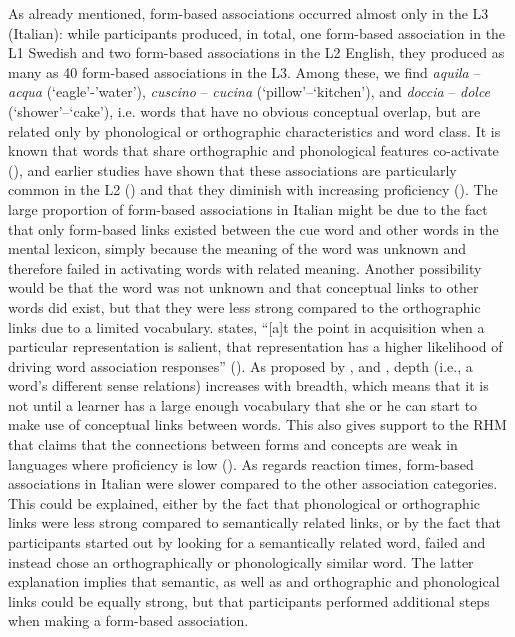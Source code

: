 \documentclass[output=paper,colorlinks,citecolor=brown,nonflat]{langsci/langscibook}
\begin{document}
As already mentioned, form-based associations occurred almost only in the L3 (Italian): while participants produced, in total, one form-based association in the L1 Swedish and two form-based associations in the L2 English, they produced as many as 40 form-based associations in the L3. Among these, we find \textit{aquila} – \textit{acqua} (‘eagle’-’water’), \textit{cuscino} – \textit{cucina} (‘pillow’–‘kitchen’), and \textit{doccia} – \textit{dolce} (‘shower’–‘cake’), i.e. words that have no obvious conceptual overlap, but are related only by phonological or orthographic characteristics and word class. It is known that words that share orthographic and phonological features co-activate (\citealt{VanHeuvenEtAl1998, Aitchison2012}), and earlier studies have shown that these associations are particularly common in the L2 (\citealt{Meara1978, FitzpatrickIzura2011}) and that they diminish with increasing proficiency (\citealt{RiegelZivian1972}). The large proportion of form-based associations in Italian might be due to the fact that only form-based links existed between the cue word and other words in the mental lexicon, simply because the meaning of the word was unknown and therefore failed in activating words with related meaning. Another possibility would be that the word was not unknown and that conceptual links to other words did exist, but that they were less strong compared to the orthographic links due to a limited vocabulary. \citeauthor{EllisN1996} states, “[a]t the point in acquisition when a particular representation is salient, that representation has a higher likelihood of driving word association responses” (\citeyear[93]{EllisN1996}). As proposed by \citet{Nation2001}, and \citet{HaastrupHenriksen2000}, depth (i.e., a word’s different sense relations) increases with breadth, which means that it is not until a learner has a large enough vocabulary that she or he can start to make use of conceptual links between words. This also gives support to the RHM that claims that the connections between forms and concepts are weak in languages where proficiency is low (\citealt{KrollStewart1994}). As regards reaction times, form-based associations in Italian were slower compared to the other association categories. This could be explained, either by the fact that phonological or orthographic links were less strong compared to semantically related links, or by the fact that participants started out by looking for a semantically related word, failed and instead chose an orthographically or phonologically similar word. The latter explanation implies that semantic, as well as and orthographic and phonological links could be equally strong, but that participants performed additional steps when making a form-based association.
\end{document}
